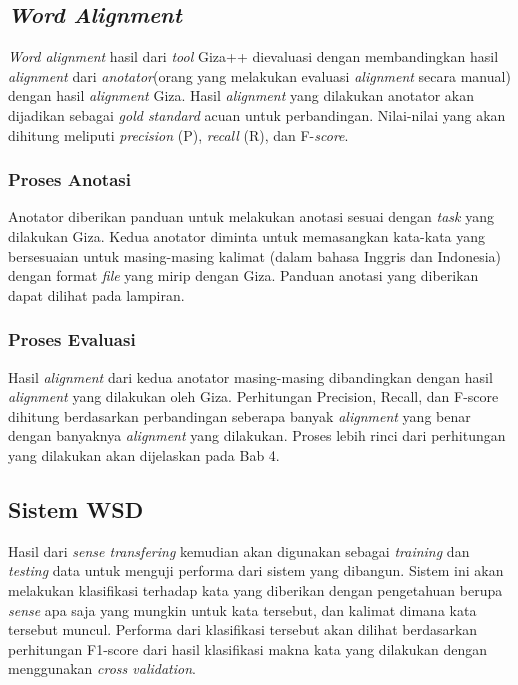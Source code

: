 \subsection{\textit{Word Alignment}}
\textit{Word alignment} hasil dari \textit{tool} Giza++ dievaluasi dengan membandingkan hasil \textit{alignment} dari \textit{anotator}(orang yang melakukan evaluasi \textit{alignment} secara manual) dengan hasil \textit{alignment} Giza. Hasil \textit{alignment} yang dilakukan anotator akan dijadikan sebagai \textit{gold standard} acuan untuk perbandingan. Nilai-nilai yang akan dihitung meliputi \textit{precision} (P), \textit{recall} (R), dan F-\textit{score}. 

\subsubsection{Proses Anotasi}

Anotator diberikan panduan untuk melakukan anotasi sesuai dengan \textit{task} yang dilakukan Giza. Kedua anotator diminta untuk memasangkan kata-kata yang bersesuaian untuk masing-masing kalimat (dalam bahasa Inggris dan Indonesia) dengan format \textit{file} yang mirip dengan Giza. Panduan anotasi yang diberikan dapat dilihat pada lampiran.

\subsubsection{Proses Evaluasi}

Hasil \textit{alignment} dari kedua anotator masing-masing dibandingkan dengan hasil \textit{alignment} yang dilakukan oleh Giza. Perhitungan Precision, Recall, dan F-score dihitung berdasarkan perbandingan seberapa banyak \textit{alignment} yang benar dengan banyaknya \textit{alignment} yang dilakukan. Proses lebih rinci dari perhitungan yang dilakukan akan dijelaskan pada Bab 4.

\subsection{Sistem WSD}
Hasil dari \textit{sense transfering} kemudian akan digunakan sebagai \textit{training} dan \textit{testing} data untuk menguji performa dari sistem yang dibangun. 
Sistem ini akan melakukan klasifikasi terhadap kata yang diberikan dengan pengetahuan berupa \textit{sense} apa saja yang mungkin untuk kata tersebut, dan kalimat dimana kata tersebut muncul. Performa dari klasifikasi tersebut akan dilihat berdasarkan perhitungan F1-score dari hasil klasifikasi makna kata yang dilakukan dengan menggunakan \textit{cross validation}.